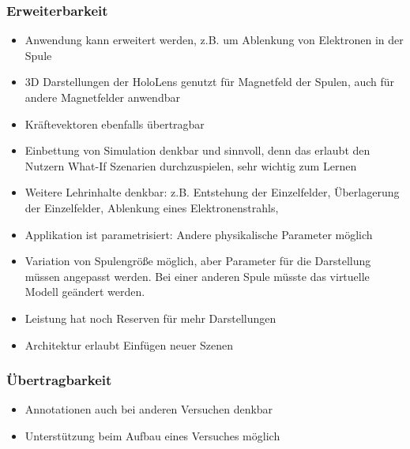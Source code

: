 \subsubsection{Erweiterbarkeit}
\begin{itemize}
	\item Anwendung kann erweitert werden, z.B. um Ablenkung von Elektronen in der Spule
	\item 3D Darstellungen der HoloLens genutzt für Magnetfeld der Spulen, auch für andere Magnetfelder anwendbar
	\item Kräftevektoren ebenfalls übertragbar
	\item Einbettung von Simulation denkbar und sinnvoll, denn das erlaubt den Nutzern What-If Szenarien durchzuspielen, sehr wichtig zum Lernen
	\item Weitere Lehrinhalte denkbar: z.B. Entstehung der Einzelfelder, Überlagerung der Einzelfelder, Ablenkung eines Elektronenstrahls, 
	\item Applikation ist parametrisiert: Andere physikalische Parameter möglich
	\item Variation von Spulengröße möglich, aber Parameter für die Darstellung müssen angepasst werden. Bei einer anderen Spule müsste das virtuelle Modell geändert werden.
	\item Leistung hat noch Reserven für mehr Darstellungen
	\item Architektur erlaubt Einfügen neuer Szenen
\end{itemize}

\subsubsection{Übertragbarkeit}
\begin{itemize}
	\item Annotationen auch bei anderen Versuchen denkbar
	\item Unterstützung beim Aufbau eines Versuches möglich
\end{itemize}
	
	
	
	
	
	
	
	
	
	
	
	
	
	